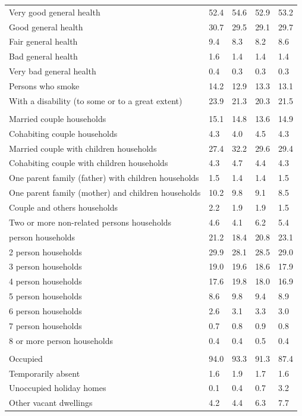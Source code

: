 \documentclass{article}
\begin{document}
\begin{table}[h]
\begin{tabular}{KTTTT}
    \hline
Very good general health & 52.4& 54.6&52.9& 53.2\\
Good general health & 30.7& 29.5& 29.1& 29.7\\
Fair general health & 9.4& 8.3&8.2& 8.6\\
Bad general health & 1.6& 1.4&1.4& 1.4\\
Very bad general health & 0.4& 0.3&0.3& 0.3\\
    \hline
Persons who smoke & 14.2& 12.9&13.3& 13.1\\
    \hline
With a disability (to some or to a great extent) & 23.9& 21.3&20.3& 21.5\\
\hline
    \\ 
    \hline
Married couple households & 15.1& 14.8& 13.6& 14.9\\
Cohabiting couple households & 4.3& 4.0& 4.5& 4.3\\
Married couple with children households & 27.4& 32.2& 29.6& 29.4\\
Cohabiting couple with children households & 4.3& 4.7& 4.4& 4.3\\
One parent family (father) with  children households & 1.5& 1.4& 1.4& 1.5\\
One parent family (mother) and children households & 10.2&  9.8&  9.1&  8.5\\
Couple and others households  & 2.2& 1.9& 1.9& 1.5\\
Two or more non-related persons households & 4.6& 4.1& 6.2& 5.4\\
     person households & 21.2& 18.4& 20.8& 23.1\\
2 person households & 29.9& 28.1& 28.5& 29.0\\
3 person households & 19.0& 19.6& 18.6& 17.9\\
4 person households & 17.6& 19.8& 18.0& 16.9\\
5 person households & 8.6& 9.8& 9.4& 8.9\\
6 person households & 2.6& 3.1& 3.3& 3.0\\
7 person households & 0.7& 0.8& 0.9& 0.8\\
8 or more person households & 0.4& 0.4& 0.5& 0.4\\
\hline
    \\ 
    \hline
Occupied & 94.0& 93.3& 91.3& 87.4\\
Temporarily absent & 1.6& 1.9& 1.7& 1.6\\
Unoccupied holiday homes & 0.1& 0.4& 0.7& 3.2\\
Other vacant dwellings & 4.2& 4.4& 6.3& 7.7\\
\hline
\end{tabular}
\end{table}
\end{document}
